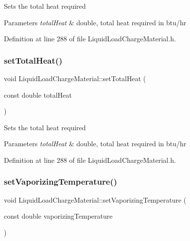 Sets the total heat required 
\begin{DoxyParams}{Parameters}
{\em total\+Heat} & double, total heat required in btu/hr \\
\hline
\end{DoxyParams}


Definition at line 288 of file Liquid\+Load\+Charge\+Material.\+h.

\mbox{\label{class_liquid_load_charge_material_ad45afc317b72c89cc46016e0b05b50b3}} 
\subsubsection{\texorpdfstring{set\+Total\+Heat()}{setTotalHeat()}\hspace{0.1cm}{\footnotesize\ttfamily [3/3]}}
{\footnotesize\ttfamily void Liquid\+Load\+Charge\+Material\+::set\+Total\+Heat (\begin{DoxyParamCaption}\item[{const double}]{total\+Heat }\end{DoxyParamCaption})\hspace{0.3cm}{\ttfamily [inline]}}

Sets the total heat required 
\begin{DoxyParams}{Parameters}
{\em total\+Heat} & double, total heat required in btu/hr \\
\hline
\end{DoxyParams}


Definition at line 288 of file Liquid\+Load\+Charge\+Material.\+h.

\mbox{\label{class_liquid_load_charge_material_a50938e3270de5d3c59b872f290a761cc}} 
\subsubsection{\texorpdfstring{set\+Vaporizing\+Temperature()}{setVaporizingTemperature()}\hspace{0.1cm}{\footnotesize\ttfamily [1/3]}}
{\footnotesize\ttfamily void Liquid\+Load\+Charge\+Material\+::set\+Vaporizing\+Temperature (\begin{DoxyParamCaption}\item[{const double}]{vaporizing\+Temperature }\end{DoxyParamCaption})\hspace{0.3cm}{\ttfamily [inline]}}

